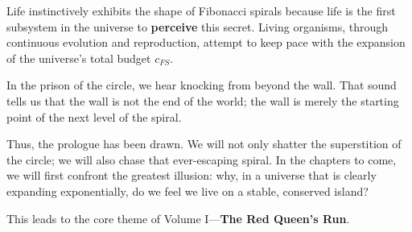 Life instinctively exhibits the shape of Fibonacci spirals because life is the first subsystem in the universe to \textbf{perceive} this secret. Living organisms, through continuous evolution and reproduction, attempt to keep pace with the expansion of the universe's total budget $c_{FS}$.

In the prison of the circle, we hear knocking from beyond the wall. That sound tells us that the wall is not the end of the world; the wall is merely the starting point of the next level of the spiral.

Thus, the prologue has been drawn. We will not only shatter the superstition of the circle; we will also chase that ever-escaping spiral. In the chapters to come, we will first confront the greatest illusion: why, in a universe that is clearly expanding exponentially, do we feel we live on a stable, conserved island?

This leads to the core theme of Volume I---\textbf{The Red Queen's Run}.

